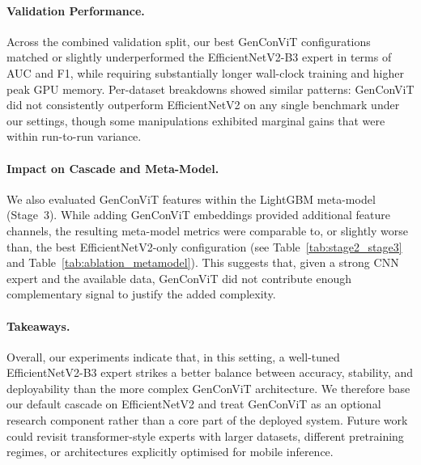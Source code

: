 \paragraph{Validation Performance.}
Across the combined validation split, our best GenConViT configurations matched or slightly underperformed the EfficientNetV2\hyp B3 expert in terms of AUC and F1, while requiring substantially longer wall\hyp clock training and higher peak GPU memory. Per\hyp dataset breakdowns showed similar patterns: GenConViT did not consistently outperform EfficientNetV2 on any single benchmark under our settings, though some manipulations exhibited marginal gains that were within run\hyp to\hyp run variance.

\paragraph{Impact on Cascade and Meta\hyp Model.}
We also evaluated GenConViT features within the LightGBM meta\hyp model (Stage~3). While adding GenConViT embeddings provided additional feature channels, the resulting meta\hyp model metrics were comparable to, or slightly worse than, the best EfficientNetV2\hyp only configuration (see Table~\ref{tab:stage2_stage3} and Table~\ref{tab:ablation_metamodel}). This suggests that, given a strong CNN expert and the available data, GenConViT did not contribute enough complementary signal to justify the added complexity.

\paragraph{Takeaways.}
Overall, our experiments indicate that, in this setting, a well\hyp tuned EfficientNetV2\hyp B3 expert strikes a better balance between accuracy, stability, and deployability than the more complex GenConViT architecture. We therefore base our default cascade on EfficientNetV2 and treat GenConViT as an optional research component rather than a core part of the deployed system. Future work could revisit transformer\hyp style experts with larger datasets, different pretraining regimes, or architectures explicitly optimised for mobile inference.
